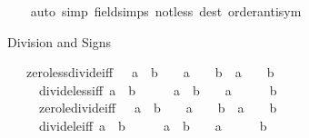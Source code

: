 \begin{isabellebody}
%
\isadelimproof
\ \ %
\endisadelimproof
%
\isatagproof
{}\isamarkupfalse%
\ {\isacharparenleft}{\kern0pt}auto\ simp{\isacharcolon}{\kern0pt}\ field{\isacharunderscore}{\kern0pt}simps\ not{\isacharunderscore}{\kern0pt}less\ dest{\isacharcolon}{\kern0pt}\ order{\isachardot}{\kern0pt}antisym{\isacharparenright}{\kern0pt}%
\endisatagproof
{\isafoldproof}%
%
\isadelimproof
%
\endisadelimproof
%
\begin{isamarkuptext}%
Division and Signs%
\end{isamarkuptext}\isamarkuptrue%
\isamarkupfalse%
\isanewline
\ \ \ zero{\isacharunderscore}{\kern0pt}less{\isacharunderscore}{\kern0pt}divide{\isacharunderscore}{\kern0pt}iff{\isacharcolon}{\kern0pt}\ {\isachardoublequoteopen}{}\ {\isacharless}{\kern0pt}\ a\ {\isacharslash}{\kern0pt}\ b\ {\isasymlongleftrightarrow}\ {}\ {\isacharless}{\kern0pt}\ a\ {\isasymand}\ {}\ {\isacharless}{\kern0pt}\ b\ {\isasymor}\ a\ {\isacharless}{\kern0pt}\ {}\ {\isasymand}\ b\ {\isacharless}{\kern0pt}\ {}{\isachardoublequoteclose}\isanewline
\ \ \ \ \ divide{\isacharunderscore}{\kern0pt}less{\isacharunderscore}{\kern0pt}{}{\isacharunderscore}{\kern0pt}iff{\isacharcolon}{\kern0pt}\ {\isachardoublequoteopen}a\ {\isacharslash}{\kern0pt}\ b\ {\isacharless}{\kern0pt}\ {}\ {\isasymlongleftrightarrow}\ {}\ {\isacharless}{\kern0pt}\ a\ {\isasymand}\ b\ {\isacharless}{\kern0pt}\ {}\ {\isasymor}\ a\ {\isacharless}{\kern0pt}\ {}\ {\isasymand}\ {}\ {\isacharless}{\kern0pt}\ b{\isachardoublequoteclose}\isanewline
\ \ \ \ \ zero{\isacharunderscore}{\kern0pt}le{\isacharunderscore}{\kern0pt}divide{\isacharunderscore}{\kern0pt}iff{\isacharcolon}{\kern0pt}\ {\isachardoublequoteopen}{}\ {\isasymle}\ a\ {\isacharslash}{\kern0pt}\ b\ {\isasymlongleftrightarrow}\ {}\ {\isasymle}\ a\ {\isasymand}\ {}\ {\isasymle}\ b\ {\isasymor}\ a\ {\isasymle}\ {}\ {\isasymand}\ b\ {\isasymle}\ {}{\isachardoublequoteclose}\isanewline
\ \ \ \ \ divide{\isacharunderscore}{\kern0pt}le{\isacharunderscore}{\kern0pt}{}{\isacharunderscore}{\kern0pt}iff{\isacharcolon}{\kern0pt}\ {\isachardoublequoteopen}a\ {\isacharslash}{\kern0pt}\ b\ {\isasymle}\ {}\ {\isasymlongleftrightarrow}\ {}\ {\isasymle}\ a\ {\isasymand}\ b\ {\isasymle}\ {}\ {\isasymor}\ a\ {\isasymle}\ {}\ {\isasymand}\ {}\ {\isasymle}\ b{\isachardoublequoteclose}\isanewline

\end{isabellebody}
